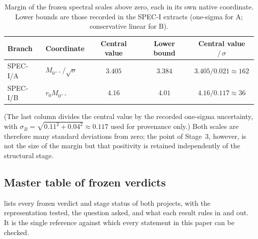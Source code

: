 \documentclass[11pt,a4paper]{article}
\theoremstyle{definition}
\theoremstyle{remark}
\newcommand{\sqs}{\sqrt{\sigma}}
\begin{document}
\begin{table}[t]
\centering\small
\caption{Margin of the frozen spectral scales above zero, each in its own native coordinate. Lower bounds are those recorded in the SPEC-I extracts (one-sigma for A; conservative linear for B).}\label{tab:margin}
\begin{tabular}{@{}llccc@{}}
\toprule
Branch & Coordinate & Central value & Lower bound & Central value $/\,\sigma$\\\midrule
SPEC-I/A & $M_{0^{++}}/\sqs$ & $3.405$ & $3.384$ & $3.405/0.021\approx162$\\
SPEC-I/B & $r_0M_{0^{++}}$ & $4.16$ & $4.01$ & $4.16/0.117\approx36$\\\bottomrule
\end{tabular}
\end{table}
(The last column divides the central value by the recorded one-sigma uncertainty, with $\sigma_B=\sqrt{0.11^2+0.04^2}\approx0.117$ used for provenance only.) Both scales are therefore many standard deviations from zero; the point of Stage~3, however, is not the size of the margin but that positivity is retained independently of the structural stage.

\subsection{Master table of frozen verdicts}\label{sec:master}
 lists every frozen verdict and stage status of both projects, with the representation tested, the question asked, and what each result rules in and out. It is the single reference against which every statement in this paper can be checked.
\end{document}
